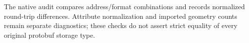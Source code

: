 The native audit compares \ExtCheckedAddresses{} address/format combinations and
records \ExtRoundtripDifferences{} normalized round-trip differences. Attribute
normalization and imported geometry counts remain separate diagnostics; these
checks do not assert strict equality of every original protobuf storage type.
